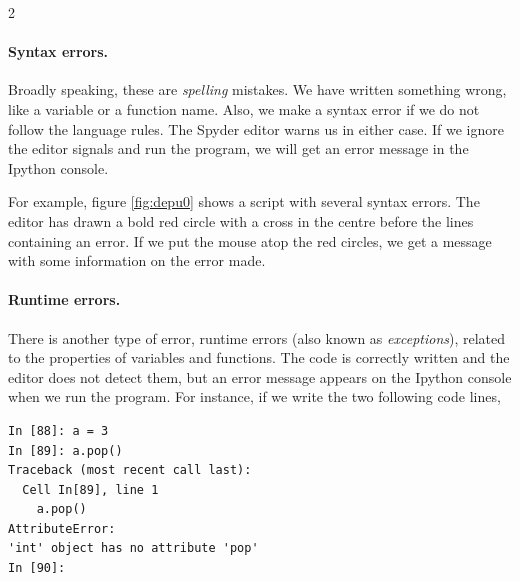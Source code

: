 \begin{paracol}{2}
\paragraph{Syntax errors.} Broadly speaking, these are \emph{spelling} mistakes. We have written something wrong, like a variable or a function name. Also, we make a syntax error if we do not follow the language rules. The Spyder editor warns us in either case. If we ignore the editor signals and run the program, we will get an error message in the Ipython console. 

For example, figure \ref{fig:depu0} shows a script with several syntax errors. The editor has drawn a bold red circle with a cross in the centre before the lines containing an error. If we put the mouse atop the red circles, we get a message with some information on the error made.

\paragraph{Runtime errors.} There is another type of error, runtime errors (also known as \emph{exceptions}), related to the properties of variables and functions. The code is correctly written and the editor does not detect them, but an error message appears on the Ipython console when we run the program. For instance, if we write the two following code lines, 
\end{paracol}
\begin{center}
    \begin{minipage}{.4\textwidth}
\begin{verbatim}
In [88]: a = 3
In [89]: a.pop()
Traceback (most recent call last):
  Cell In[89], line 1
    a.pop()
AttributeError: 
'int' object has no attribute 'pop'
In [90]:
\end{verbatim}
\end{minipage}
\end{center}

